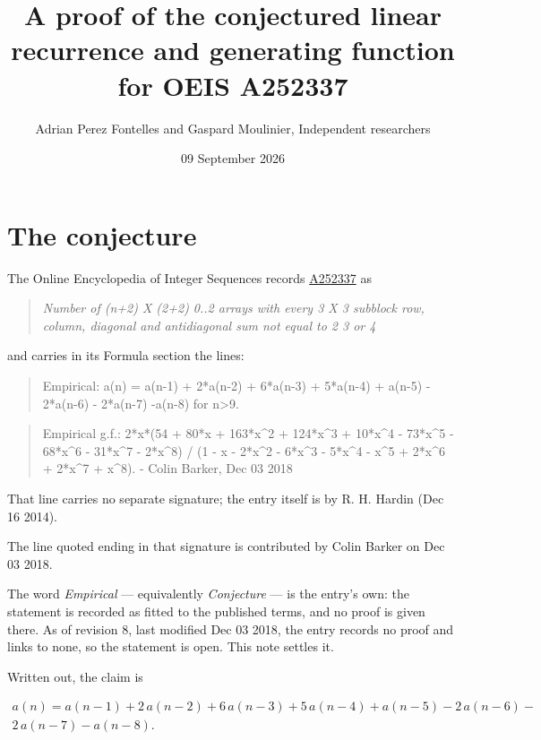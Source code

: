 \documentclass[11pt]{article}
\title{A proof of the conjectured linear recurrence and generating function for OEIS A252337}
\author{Adrian Perez Fontelles and Gaspard Moulinier, Independent researchers}
\date{09 September 2026}
\theoremstyle{definition}
\begin{document}
\maketitle
\section{The conjecture}

The Online Encyclopedia of Integer Sequences records \href{https://oeis.org/A252337}{A252337} as

\begin{quote}\itshape Number of (n+2) X (2+2) 0..2 arrays with every 3 X 3 subblock row, column, diagonal and antidiagonal sum not equal to 2 3 or 4\end{quote}

and carries in its Formula section the lines:

\begin{quote}\ttfamily Empirical: a(n) = a(n-1) + 2*a(n-2) + 6*a(n-3) + 5*a(n-4) + a(n-5) - 2*a(n-6) - 2*a(n-7) -a(n-8) for n>9.\end{quote}

\begin{quote}\ttfamily Empirical g.f.: 2*x*(54 + 80*x + 163*x\textasciicircum{}2 + 124*x\textasciicircum{}3 + 10*x\textasciicircum{}4 - 73*x\textasciicircum{}5 - 68*x\textasciicircum{}6 - 31*x\textasciicircum{}7 - 2*x\textasciicircum{}8) / (1 - x - 2*x\textasciicircum{}2 - 6*x\textasciicircum{}3 - 5*x\textasciicircum{}4 - x\textasciicircum{}5 + 2*x\textasciicircum{}6 + 2*x\textasciicircum{}7 + x\textasciicircum{}8). - Colin Barker, Dec 03 2018\end{quote}

That line carries no separate signature; the entry itself is by R. H. Hardin (Dec 16 2014).

The line quoted ending in that signature is contributed by Colin Barker on Dec 03 2018.

The word {\itshape Empirical} --- equivalently {\itshape Conjecture} --- is the entry's own: the statement is recorded as fitted to the published terms, and no proof is given there. As of revision 8, last modified Dec 03 2018, the entry records no proof and links to none, so the statement is open. This note settles it.

Written out, the claim is

\begin{multline*} a(n) = a(n-1) + 2\,a(n-2) + 6\,a(n-3) + 5\,a(n-4) + a(n-5) - 2\,a(n-6) - \\ 2\,a(n-7) - a(n-8). \end{multline*}
\end{document}
